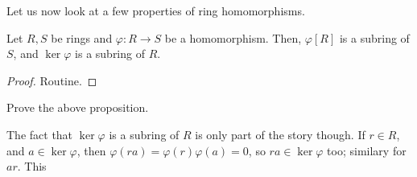 \documentclass[./main.tex]{subfiles}
\begin{document}
Let us now look at a few properties of ring homomorphisms. 

\begin{proposition}
    Let $R, S$ be rings and $\varphi: R \to S$ be a homomorphism. Then,
    $\varphi[R]$ is a subring of $S$, and $\ker \varphi$ is a subring of $R$. 
\end{proposition}
\begin{proof}
    Routine.
\end{proof}
\begin{exercise}
    Prove the above proposition.
\end{exercise}

The fact that $\ker \varphi$ is a subring of $R$ is only part of the story
though. If $r \in R$, and $a \in \ker \varphi$, then $\varphi(ra) = \varphi(r)
\varphi(a) = 0$, so $ra \in \ker \varphi$ too; similary for $ar$. This 
\end{document}
